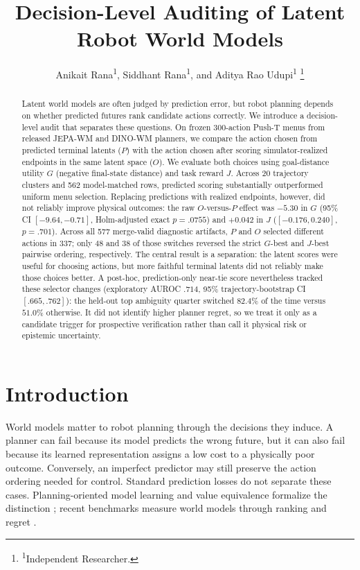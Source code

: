 \documentclass[letterpaper,10pt,conference]{ieeeconf}
\title{\LARGE \bf Decision-Level Auditing of Latent Robot World Models}
\author{Anikait Rana\textsuperscript{1}, Siddhant Rana\textsuperscript{1}, and Aditya Rao Udupi\textsuperscript{1}%
\thanks{\textsuperscript{1}Independent Researcher.}}
\begin{document}
\maketitle

\begin{abstract}
Latent world models are often judged by prediction error, but robot planning
depends on whether predicted futures rank candidate actions correctly. We introduce a
decision-level audit that separates these questions. On frozen 300-action
Push-T menus from released JEPA-WM and DINO-WM planners, we compare the action
chosen from predicted terminal latents ($P$) with the action chosen after
scoring simulator-realized endpoints in the same latent space ($O$). We evaluate
both choices using goal-distance utility $G$ (negative final-state distance) and
task reward $J$. Across 20 trajectory clusters and 562 model-matched rows,
predicted scoring substantially
outperformed uniform menu selection. Replacing predictions with realized
endpoints, however, did not reliably improve physical outcomes: the raw
$O$-versus-$P$ effect was $-5.30$ in $G$ (95\% CI $[-9.64,-0.71]$,
Holm-adjusted exact $p=.0755$) and $+0.042$ in $J$ ($[-0.176,0.240]$,
$p=.701$). Across all 577 merge-valid diagnostic artifacts, $P$ and $O$ selected
different actions in 337; only 48 and 38 of those switches reversed the strict
$G$-best and $J$-best pairwise ordering, respectively. The central result is a
separation: the latent scores were useful for choosing actions, but more faithful
terminal latents did not reliably make those choices better. A post-hoc,
prediction-only near-tie score nevertheless tracked these selector changes
(exploratory AUROC $.714$, 95\% trajectory-bootstrap CI $[.665,.762]$): the
held-out top ambiguity quarter switched $82.4\%$ of the time versus $51.0\%$
otherwise. It did not identify higher planner regret, so we treat it only as a
candidate trigger for prospective verification rather than call it physical
risk or epistemic uncertainty.
\end{abstract}

\section{Introduction}

World models matter to robot planning through the decisions they induce. A
planner can fail because its model predicts the wrong future, but it can also
fail because its learned representation assigns a low cost to a physically poor
outcome. Conversely, an imperfect predictor may still preserve the action
ordering needed for control. Standard prediction losses do not separate these
cases. Planning-oriented model learning and value equivalence formalize the
distinction
\cite{pmlr-v54-farahmand17a,pmlr-v120-lambert20a,pmlr-v119-nair20a,grimm2020value};
recent benchmarks measure world models through ranking and regret
\cite{reka2026worldmodelgym,pmlr-v267-yin25f}.
\end{document}
